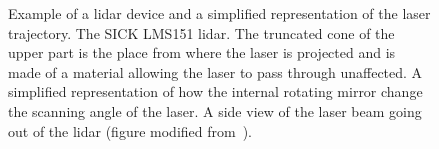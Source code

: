 \begin{figure}[h]
    \centering
    \caption[Example of a \gls*{lidar} device and a simplified representation of the laser trajectory.]{Example of a \gls*{lidar} device and a simplified representation of the laser trajectory. \protect{} The SICK LMS151 \gls*{lidar}. The truncated cone of the upper part is the place from where the laser is projected and is made of a material allowing the laser to pass through unaffected. \protect{} A simplified representation of how the internal rotating mirror change the scanning angle of the laser. \protect{} A side view of the laser beam going out of the \gls*{lidar} (figure modified from~\citep{LMS151Manual}).}
    \label{fig:lidar_basics}
\end{figure}

